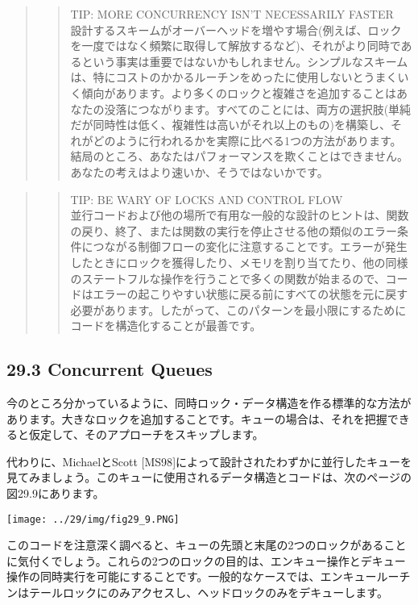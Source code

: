 \begin{quote}
\begin{quote}
TIP: MORE CONCURRENCY ISN'T NECESSARILY FASTER\\
設計するスキームがオーバーヘッドを増やす場合(例えば、ロックを一度ではなく頻繁に取得して解放するなど)、それがより同時であるという事実は重要ではないかもしれません。シンプルなスキームは、特にコストのかかるルーチンをめったに使用しないとうまくいく傾向があります。より多くのロックと複雑さを追加することはあなたの没落につながります。すべてのことには、両方の選択肢(単純だが同時性は低く、複雑性は高いがそれ以上のもの)を構築し、それがどのように行われるかを実際に比べる1つの方法があります。結局のところ、あなたはパフォーマンスを欺くことはできません。あなたの考えはより速いか、そうではないかです。
\end{quote}
\end{quote}

\begin{quote}
\begin{quote}
TIP: BE WARY OF LOCKS AND CONTROL FLOW\\
並行コードおよび他の場所で有用な一般的な設計のヒントは、関数の戻り、終了、または関数の実行を停止させる他の類似のエラー条件につながる制御フローの変化に注意することです。エラーが発生したときにロックを獲得したり、メモリを割り当てたり、他の同様のステートフルな操作を行うことで多くの関数が始まるので、コードはエラーの起こりやすい状態に戻る前にすべての状態を元に戻す必要があります。したがって、このパターンを最小限にするためにコードを構造化することが最善です。
\end{quote}
\end{quote}

\hypertarget{concurrent-queues}{%
\subsection*{29.3 Concurrent Queues}\label{concurrent-queues}}

今のところ分かっているように、同時ロック・データ構造を作る標準的な方法があります。大きなロックを追加することです。キューの場合は、それを把握できると仮定して、そのアプローチをスキップします。

代わりに、MichaelとScott
{[}MS98{]}によって設計されたわずかに並行したキューを見てみましょう。このキューに使用されるデータ構造とコードは、次のページの図29.9にあります。

\texttt{[image: ../29/img/fig29\_9.PNG]}

このコードを注意深く調べると、キューの先頭と末尾の2つのロックがあることに気付くでしょう。これらの2つのロックの目的は、エンキュー操作とデキュー操作の同時実行を可能にすることです。一般的なケースでは、エンキュールーチンはテールロックにのみアクセスし、ヘッドロックのみをデキューします。

